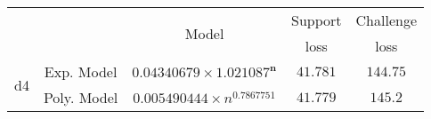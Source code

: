 \begin{tabular}{ccccc} 
\hline 
 &  & \multirow{2}{*}{Model} & Support & Challenge\tabularnewline 
 &  &  & loss  & loss\tabularnewline 
\hline 
\hline 
\multirow{2}{*}{d4} & Exp. Model & $\mathbf{0.04340679\times 1.021087^{n}}$ & $\mathbf{41.781}$ & $\mathbf{144.75}$ \tabularnewline 
 & Poly. Model & $0.005490444\times n^{0.7867751}$ & $41.779$ & $145.2$ \tabularnewline 
\hline 
\end{tabular} 

